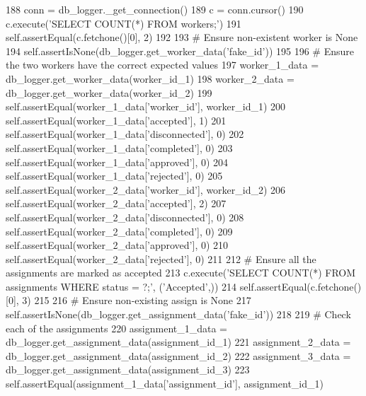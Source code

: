 \begin{DoxyCode}
188         conn = db\_logger.\_get\_connection()
189         c = conn.cursor()
190         c.execute(\textcolor{stringliteral}{'SELECT COUNT(*) FROM workers;'})
191         self.assertEqual(c.fetchone()[0], 2)
192 
193         \textcolor{comment}{# Ensure non-existent worker is None}
194         self.assertIsNone(db\_logger.get\_worker\_data(\textcolor{stringliteral}{'fake\_id'}))
195 
196         \textcolor{comment}{# Ensure the two workers have the correct expected values}
197         worker\_1\_data = db\_logger.get\_worker\_data(worker\_id\_1)
198         worker\_2\_data = db\_logger.get\_worker\_data(worker\_id\_2)
199         self.assertEqual(worker\_1\_data[\textcolor{stringliteral}{'worker\_id'}], worker\_id\_1)
200         self.assertEqual(worker\_1\_data[\textcolor{stringliteral}{'accepted'}], 1)
201         self.assertEqual(worker\_1\_data[\textcolor{stringliteral}{'disconnected'}], 0)
202         self.assertEqual(worker\_1\_data[\textcolor{stringliteral}{'completed'}], 0)
203         self.assertEqual(worker\_1\_data[\textcolor{stringliteral}{'approved'}], 0)
204         self.assertEqual(worker\_1\_data[\textcolor{stringliteral}{'rejected'}], 0)
205         self.assertEqual(worker\_2\_data[\textcolor{stringliteral}{'worker\_id'}], worker\_id\_2)
206         self.assertEqual(worker\_2\_data[\textcolor{stringliteral}{'accepted'}], 2)
207         self.assertEqual(worker\_2\_data[\textcolor{stringliteral}{'disconnected'}], 0)
208         self.assertEqual(worker\_2\_data[\textcolor{stringliteral}{'completed'}], 0)
209         self.assertEqual(worker\_2\_data[\textcolor{stringliteral}{'approved'}], 0)
210         self.assertEqual(worker\_2\_data[\textcolor{stringliteral}{'rejected'}], 0)
211 
212         \textcolor{comment}{# Ensure all the assignments are marked as accepted}
213         c.execute(\textcolor{stringliteral}{'SELECT COUNT(*) FROM assignments WHERE status = ?;'}, (\textcolor{stringliteral}{'Accepted'},))
214         self.assertEqual(c.fetchone()[0], 3)
215 
216         \textcolor{comment}{# Ensure non-existing assign is None}
217         self.assertIsNone(db\_logger.get\_assignment\_data(\textcolor{stringliteral}{'fake\_id'}))
218 
219         \textcolor{comment}{# Check each of the assignments}
220         assignment\_1\_data = db\_logger.get\_assignment\_data(assignment\_id\_1)
221         assignment\_2\_data = db\_logger.get\_assignment\_data(assignment\_id\_2)
222         assignment\_3\_data = db\_logger.get\_assignment\_data(assignment\_id\_3)
223         self.assertEqual(assignment\_1\_data[\textcolor{stringliteral}{'assignment\_id'}], assignment\_id\_1)

\end{DoxyCode}
